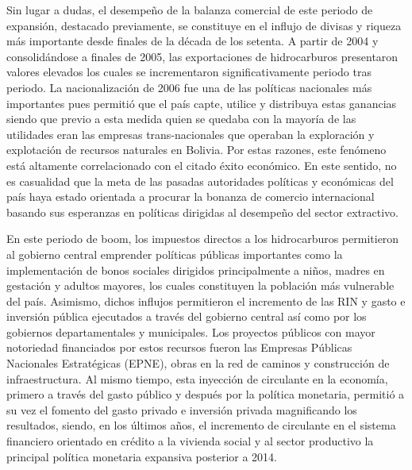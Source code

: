 \documentclass[12pt,letterpaper]{article}
\begin{document}
Sin lugar a dudas, el desempeño de la balanza comercial de este periodo de expansión, destacado previamente, se constituye en el influjo de divisas y riqueza más importante desde finales de la década de los setenta. A partir de 2004 y consolidándose a finales de 2005, las exportaciones de hidrocarburos presentaron valores elevados los cuales se incrementaron significativamente periodo tras periodo. La nacionalización de 2006 fue una de las políticas nacionales más importantes pues permitió que el país capte, utilice y distribuya estas ganancias siendo que previo a esta medida quien se quedaba con la mayoría de las utilidades eran las empresas trans-nacionales que operaban la exploración y explotación de recursos naturales en Bolivia. Por estas razones, este fenómeno está altamente correlacionado con el citado éxito económico. En este sentido, no es casualidad que la meta de las pasadas autoridades políticas y económicas del país haya estado orientada a procurar la bonanza de comercio internacional basando sus esperanzas en políticas dirigidas al desempeño del sector extractivo.

En este periodo de boom, los impuestos directos a los hidrocarburos permitieron al gobierno central emprender políticas públicas importantes como la implementación de bonos sociales dirigidos principalmente a niños, madres en gestación y adultos mayores, los cuales constituyen la población más vulnerable del país. Asimismo, dichos influjos permitieron el incremento de las RIN y gasto e inversión pública ejecutados a través del gobierno central así como por los gobiernos departamentales y municipales. Los proyectos públicos con mayor notoriedad financiados por estos recursos fueron las Empresas Públicas Nacionales Estratégicas (EPNE), obras en la red de caminos y construcción de infraestructura. Al mismo tiempo, esta inyección de circulante en la economía, primero a través del gasto público y después por la política monetaria, permitió a su vez el fomento del gasto privado e inversión privada magnificando los resultados, siendo, en los últimos años, el incremento de circulante en el sistema financiero orientado en crédito a la vivienda social y al sector productivo la principal política monetaria expansiva posterior a 2014. 
\end{document}

